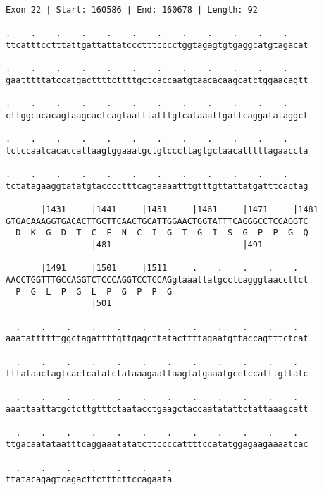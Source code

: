\documentclass{article}
\begin{document}
\begin{Verbatim}[fontfamily=courier]
Exon 22 | Start: 160586 | End: 160678 | Length: 92

.    .    .    .    .    .    .    .    .    .    .    .    
ttcatttcctttattgattattatccctttcccctggtagagtgtgaggcatgtagacat

.    .    .    .    .    .    .    .    .    .    .    .    
gaatttttatccatgacttttcttttgctcaccaatgtaacacaagcatctggaacagtt

.    .    .    .    .    .    .    .    .    .    .    .    
cttggcacacagtaagcactcagtaatttatttgtcataaattgattcaggatataggct

.    .    .    .    .    .    .    .    .    .    .    .    
tctccaatcacaccattaagtggaaatgctgtcccttagtgctaacatttttagaaccta

.    .    .    .    .    .    .    .    .    .    .    .    
tctatagaaggtatatgtacccctttcagtaaaatttgtttgttattatgatttcactag

       |1431     |1441     |1451     |1461     |1471     |1481
GTGACAAAGGTGACACTTGCTTCAACTGCATTGGAACTGGTATTTCAGGGCCTCCAGGTC
  D  K  G  D  T  C  F  N  C  I  G  T  G  I  S  G  P  P  G  Q
                 |481                          |491         

       |1491     |1501     |1511     .    .    .    .    .  
AACCTGGTTTGCCAGGTCTCCCAGGTCCTCCAGgtaaattatgcctcagggtaaccttct
  P  G  L  P  G  L  P  G  P  P  G                           
                 |501                                       

  .    .    .    .    .    .    .    .    .    .    .    .  
aaatattttttggctagattttgttgagcttatacttttagaatgttaccagtttctcat

  .    .    .    .    .    .    .    .    .    .    .    .  
tttataactagtcactcatatctataaagaattaagtatgaaatgcctccatttgttatc

  .    .    .    .    .    .    .    .    .    .    .    .  
aaattaattatgctcttgtttctaatacctgaagctaccaatatattctattaaagcatt

  .    .    .    .    .    .    .    .    .    .    .    .  
ttgacaatataatttcaggaaatatatcttccccattttccatatggagaagaaaatcac

  .    .    .    .    .    .    .
ttatacagagtcagacttctttcttccagaata
\end{Verbatim}
\newpage
\end{document}
